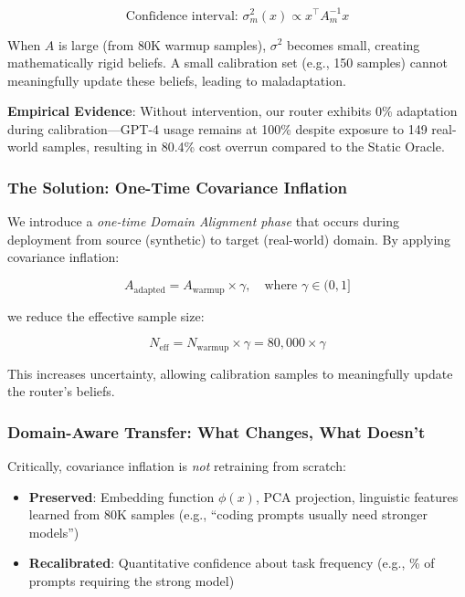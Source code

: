 \begin{equation}
    \text{Confidence interval: } \sigma^2_m(x) \propto x^\top A_m^{-1} x
\end{equation}

When $A$ is large (from 80K warmup samples), $\sigma^2$ becomes small, creating mathematically rigid beliefs. A small calibration set (e.g., 150 samples) cannot meaningfully update these beliefs, leading to maladaptation.

\textbf{Empirical Evidence}: Without intervention, our router exhibits 0\% adaptation during calibration—GPT-4 usage remains at 100\% despite exposure to 149 real-world samples, resulting in 80.4\% cost overrun compared to the Static Oracle.

\subsubsection{The Solution: One-Time Covariance Inflation}

We introduce a \emph{one-time Domain Alignment phase} that occurs during deployment from source (synthetic) to target (real-world) domain. By applying covariance inflation:

\begin{equation}
    A_{\text{adapted}} = A_{\text{warmup}} \times \gamma, \quad \text{where } \gamma \in (0, 1]
\end{equation}

we reduce the effective sample size:

\begin{equation}
    N_{\text{eff}} = N_{\text{warmup}} \times \gamma = 80{,}000 \times \gamma
\end{equation}

This increases uncertainty, allowing calibration samples to meaningfully update the router's beliefs.

\subsubsection{Domain-Aware Transfer: What Changes, What Doesn't}

Critically, covariance inflation is \emph{not} retraining from scratch:

\begin{itemize}
    \item \textbf{Preserved}: Embedding function $\phi(x)$, PCA projection, linguistic features learned from 80K samples (e.g., ``coding prompts usually need stronger models'')
    \item \textbf{Recalibrated}: Quantitative confidence about task frequency (e.g., \% of prompts requiring the strong model)
\end{itemize}

